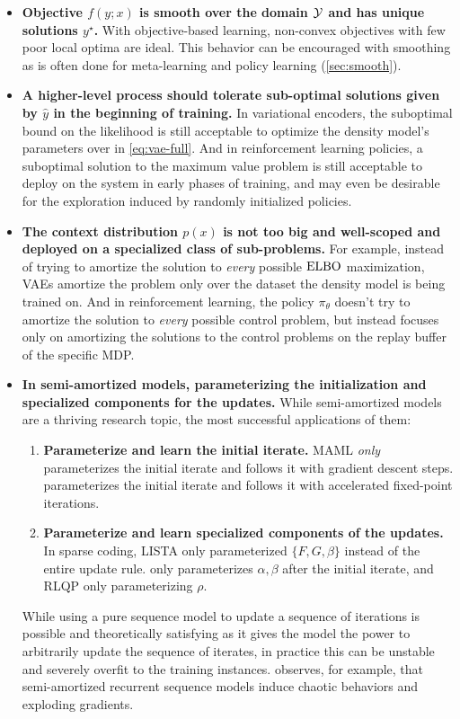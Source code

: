 \begin{itemize}
\item \textbf{Objective $f(y; x)$ is smooth over the domain ${\mathcal{Y}}$
  and has unique solutions $y^\star$.}
  With objective-based learning, non-convex objectives with
  few poor local optima are ideal.
  This behavior can be encouraged with smoothing as is
  often done for meta-learning and policy learning (\cref{sec:smooth}).
\item \textbf{A higher-level process should tolerate sub-optimal
  solutions given by $\hat y$ in the beginning of training.}
  In variational encoders, the suboptimal bound on the likelihood
  is still acceptable to optimize the density model's parameters over
  in \cref{eq:vae-full}.
  And in reinforcement learning policies,
  a suboptimal solution to the maximum value problem is still
  acceptable to deploy on the system in early phases of training,
  and may even be desirable for the exploration induced by randomly
  initialized policies.
\item \textbf{The context distribution $p(x)$ is not too big and
  well-scoped and deployed on a specialized class of sub-problems.}
  For example, instead of trying to amortize the solution to
  \emph{every} possible $\operatorname{ELBO}$ maximization, VAEs
  amortize the problem only over the dataset the density
  model is being trained on.
  And in reinforcement learning, the policy $\pi_\theta$ doesn't
  try to amortize the solution to \emph{every} possible control
  problem, but instead focuses only on amortizing the solutions
  to the control problems on the replay buffer of the
  specific MDP.
\item \textbf{In semi-amortized models, parameterizing the initialization
    and specialized components for the updates.}
  While semi-amortized models are a thriving research topic,
  the most successful applications of them:
  \begin{enumerate}
  \item \textbf{Parameterize and learn the initial iterate.}
    MAML \citep{finn2017model} \emph{only} parameterizes the initial
    iterate and follows it with gradient descent steps.
    \citet{bai2022neural} parameterizes
    the initial iterate and follows it with accelerated
    fixed-point iterations.
  \item \textbf{Parameterize and learn specialized components of the
    updates.} In sparse coding, LISTA \citep{gregor2010learning}
    only parameterized $\{F,G,\beta\}$ instead of the
    entire update rule.
    \citet{bai2022neural} only parameterizes $\alpha,\beta$
    after the initial iterate, and
    RLQP \citep{ichnowski2021accelerating} only parameterizing $\rho$.
  \end{enumerate}
  While using a pure sequence model to update a sequence of
  iterations is possible and theoretically satisfying as it
  gives the model the power to arbitrarily update the sequence
  of iterates, in practice this can be unstable and severely
  overfit to the training instances.
  \citet{metz2021gradients} observes, for example, that semi-amortized
  recurrent sequence models induce chaotic behaviors
  and exploding gradients.
\end{itemize}

